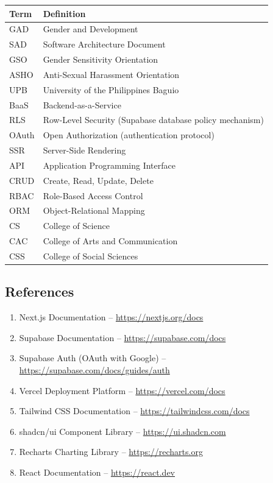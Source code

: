 \documentclass[11pt,a4paper]{article}
\begin{document}
\begin{table}[h!]
\centering
\small
\renewcommand{\arraystretch}{1.4}
\begin{tabular}{|p{3.5cm}|p{9.5cm}|}
\hline
\textbf{Term} & \textbf{Definition} \\ \hline
GAD & Gender and Development \\ \hline
SAD & Software Architecture Document \\ \hline
GSO & Gender Sensitivity Orientation \\ \hline
ASHO & Anti-Sexual Harassment Orientation \\ \hline
UPB & University of the Philippines Baguio \\ \hline
BaaS & Backend-as-a-Service \\ \hline
RLS & Row-Level Security (Supabase database policy mechanism) \\ \hline
OAuth & Open Authorization (authentication protocol) \\ \hline
SSR & Server-Side Rendering \\ \hline
API & Application Programming Interface \\ \hline
CRUD & Create, Read, Update, Delete \\ \hline
RBAC & Role-Based Access Control \\ \hline
ORM & Object-Relational Mapping \\ \hline
CS & College of Science \\ \hline
CAC & College of Arts and Communication \\ \hline
CSS & College of Social Sciences \\ \hline
\end{tabular}
\end{table}


\subsection{References}

\begin{enumerate}[leftmargin=1.5em]
  \item Next.js Documentation -- \url{https://nextjs.org/docs}
  \item Supabase Documentation -- \url{https://supabase.com/docs}
  \item Supabase Auth (OAuth with Google) -- \url{https://supabase.com/docs/guides/auth}
  \item Vercel Deployment Platform -- \url{https://vercel.com/docs}
  \item Tailwind CSS Documentation -- \url{https://tailwindcss.com/docs}
  \item shadcn/ui Component Library -- \url{https://ui.shadcn.com}
  \item Recharts Charting Library -- \url{https://recharts.org}
  \item React Documentation -- \url{https://react.dev}
\end{enumerate}
\end{document}
